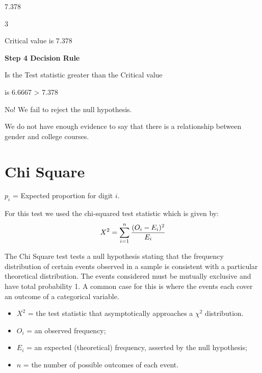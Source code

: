 \documentclass[]{report}
\begin{document}
7.378


3
















Critical value is 7.378

\textbf{Step 4 Decision Rule}

Is the Test statistic greater than the Critical value

is 6.6667 > 7.378

No! We fail to reject the null hypothesis.

We do not have enough evidence to say that there is a relationship between gender and college courses.










\section{Chi Square}


$p_{i}$ = Expected proportion for digit $i$.

For this test we used the chi-squared test statistic which is given by:
\begin{equation}
X^2 = \sum_{i=1}^{n} {(O_i - E_i)^2 \over E_i}
\end{equation}


The Chi Square test tests a null hypothesis stating that the frequency distribution of certain events observed in a sample is consistent with a particular theoretical distribution. The events considered must be mutually exclusive and have total probability 1. A common case for this is where the events each cover an outcome of a categorical variable.

\begin{itemize}
	\item $X^2$ = the test statistic that asymptotically approaches a $\chi^2$ distribution.
	\item $O_i$ = an observed frequency;
	\item $E_i$ = an expected (theoretical) frequency, asserted by the null hypothesis;
	\item $n $  = the number of possible outcomes of each event.
\end{itemize}
\end{document}
